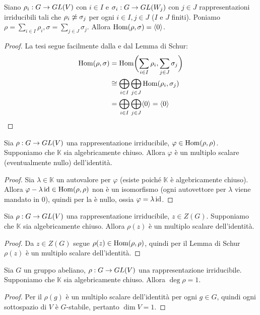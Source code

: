 \begin{corollary}
Siano $\rho_i:G\to GL(V)$ con $i\in I$ e $\sigma_i:G\to GL(W_j)$ con $j\in J$ rappresentazioni irriducibili tali che $\rho_i\not\simeq\sigma_j$ per ogni $i\in I\comma j\in J$ ($I$ e $J$ finiti). Poniamo $\rho=\sum_{i\in I}\rho_i\comma\sigma=\sum_{j\in J}\sigma_j$. Allora $\operatorname{Hom}(\rho,\sigma)=\langle 0\rangle$.
\end{corollary}
\begin{proof}
La tesi segue facilmente dalla  e dal Lemma di Schur:
\begin{align*}
\operatorname{Hom}(\rho,\sigma)&=\operatorname{Hom}\biggl(\sum_{i\in I}\rho_i,\sum_{j\in J}\sigma_j\biggr)\\
&\cong\bigoplus_{i\in I}\bigoplus_{j\in J}\operatorname{Hom}(\rho_i,\sigma_j)\\
&=\bigoplus_{i\in I}\bigoplus_{j\in J}\langle 0\rangle=\langle 0\rangle
\end{align*}
\end{proof}

\begin{proposition}
Sia $\rho:G\to GL(V)$ una rappresentazione irriducibile, $\varphi\in\operatorname{Hom}(\rho,\rho)$. Supponiamo che $\mathbb{K}$ sia algebricamente chiuso. Allora $\varphi$ è un multiplo scalare (eventualmente nullo) dell'identità.
\end{proposition}
\begin{proof}
Sia $\lambda\in\mathbb{K}$ un autovalore per $\varphi$ (esiste poiché $\mathbb{K}$ è algebricamente chiuso). Allora $\varphi-\lambda\operatorname{id}\in\operatorname{Hom}(\rho,\rho)$ non è un isomorfismo (ogni autovettore per $\lambda$ viene mandato in 0), quindi per la  è nullo, ossia $\varphi=\lambda\operatorname{id}$.
\end{proof}

\begin{corollary}
Sia $\rho:G\to GL(V)$ una rappresentazione irriducibile, $z\in Z(G)$. Supponiamo che $\mathbb{K}$ sia algebricamente chiuso. Allora $\rho(z)$ è un multiplo scalare dell'identità.
\end{corollary}
\begin{proof}
Da $z\in Z(G)$ segue $\rho(z)\in\operatorname{Hom}(\rho,\rho)$, quindi per il Lemma di Schur $\rho(z)$ è un multiplo scalare dell'identità.
\end{proof}

\begin{corollary}
Sia $G$ un gruppo abeliano, $\rho:G\to GL(V)$ una rappresentazione irriducibile. Supponiamo che $\mathbb{K}$ sia algebricamente chiuso. Allora $\deg\rho=1$.
\end{corollary}
\begin{proof}
Per il  $\rho(g)$ è un multiplo scalare dell'identità per ogni $g\in G$, quindi ogni sottospazio di $V$ è $G$-stabile, pertanto $\dim V=1$.
\end{proof}

